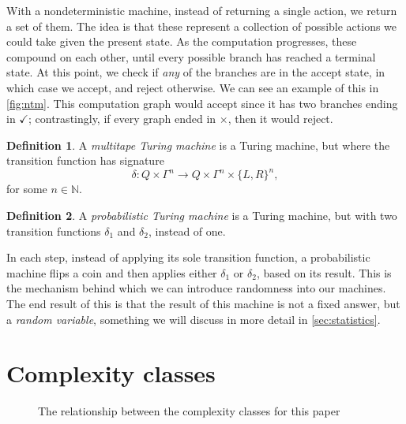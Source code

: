 \documentclass[english,12pt]{reedthesis}
\theoremstyle{plain}
\theoremstyle{definition}
\newtheorem{defn}[defn]{Definition}
\theoremstyle{remark}
\begin{document}
With a nondeterministic machine, instead of returning a single action, we return
a set of them. The idea is that these represent a collection of possible actions
we could take given the present state. As the computation progresses, these
compound on each other, until every possible branch has reached a terminal
state. At this point, we check if \emph{any} of the branches are in the accept
state, in which case we accept, and reject otherwise. We can see an example of
this in \cref{fig:ntm}. This computation graph would accept since it has two
branches ending in $\checkmark$; contrastingly, if every graph ended in $\times$, then it
would reject.

\begin{defn}\label{def:multitape-tm}
  A \emph{multitape Turing machine} is a Turing machine, but where the
  transition function has signature
  \begin{equation*}
    \delta\colon Q \times \Gamma^{n} \rightarrow Q \times \Gamma^{n} \times \{L, R\}^{n},
  \end{equation*}
  for some $n \in \mathbb{N}$.
\end{defn}

\begin{defn}\label{def:prob-tm}
  A \emph{probabilistic Turing machine} is a Turing machine, but with two
  transition functions $\delta_{1}$ and $\delta_{2}$, instead of one.
\end{defn}

In each step, instead of applying its sole transition function, a probabilistic
machine flips a coin and then applies either $\delta_{1}$ or $\delta_{2}$, based on its
result. This is the mechanism behind which we can introduce randomness into our
machines. The end result of this is that the result of this machine is not a
fixed answer, but a \emph{random variable}, something we will discuss in more
detail in \cref{sec:statistics}.

\section{Complexity classes}\label{sec:comp-class}

\begin{figure}[htbp]
  \centering
  \caption{The relationship between the complexity classes for this
    paper}\label{fig:comp-class}
\end{figure}
\end{document}
